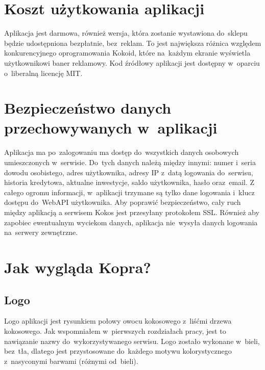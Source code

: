 \documentclass[a4paper,twoside,titlepage,openright]{book}
\begin{document}
\section{Koszt użytkowania aplikacji}

Aplikacja jest darmowa, również wersja, która zostanie wystawiona do~sklepu będzie udostępniona bezpłatnie, bez~reklam. To jest największa różnica względem konkurencyjnego oprogramowania Kokoid, które na~każdym ekranie wyświetla użytkownikowi baner reklamowy. Kod źródłowy aplikacji jest dostępny w~oparciu o~liberalną licencję MIT.

\section{Bezpieczeństwo danych przechowywanych w~aplikacji}

Aplikacja ma po~zalogowaniu ma dostęp do~wszystkich danych osobowych umieszczonych w~serwisie. Do~tych danych należą między innymi: numer i~seria dowodu osobistego, adres użytkownika, adresy IP z~datą logowania do~serwisu, historia kredytowa, aktualne inwestycje, saldo użytkownika, hasło oraz~email. Z całego ogromu informacji, w~aplikacji trzymane są tylko dane logowania i~klucz dostępu do~WebAPI użytkownika. Aby poprawić bezpieczeństwo, cały ruch między aplikacją a serwisem Kokos jest przesyłany protokołem SSL. Również aby zapobiec ewentualnym wyciekom danych, aplikacja nie~wysyła danych logowania na~serwery zewnętrzne.

\section{Jak wygląda Kopra?}

\subsection{Logo}

Logo aplikacji jest rysunkiem połowy owocu kokosowego z~liśćmi drzewa kokosowego. Jak wspomniałem w~pierwszych rozdziałach pracy, jest to nawiązanie nazwy do~wykorzystywanego serwisu. Logo zostało wykonane w~bieli, bez~tła, dlatego jest przystosowane do~każdego motywu kolorystycznego z~nasyconymi barwami (różnymi od~bieli).
\end{document}
